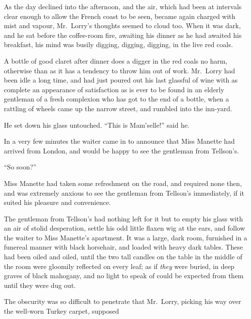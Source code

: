 As the day declined into the afternoon, and the air, which had been
at intervals clear enough to allow the French coast to be seen,
became again charged with mist and vapour, Mr.\ Lorry's thoughts
seemed to cloud too.  When it was dark, and he sat before the
coffee-room fire, awaiting his dinner as he had awaited his breakfast,
his mind was busily digging, digging, digging, in the live red coals.

A bottle of good claret after dinner does a digger in the red coals
no harm, otherwise than as it has a tendency to throw him out of
work.  Mr.\ Lorry had been idle a long time, and had just poured out
his last glassful of wine with as complete an appearance of
satisfaction as is ever to be found in an elderly gentleman of a
fresh complexion who has got to the end of a bottle, when a rattling
of wheels came up the narrow street, and rumbled into the inn-yard.

He set down his glass untouched.  ``This is Mam'selle!'' said he.

In a very few minutes the waiter came in to announce that Miss
Manette had arrived from London, and would be happy to see the
gentleman from Tellson's.

``So soon?''

Miss Manette had taken some refreshment on the road, and required
none then, and was extremely anxious to see the gentleman from
Tellson's immediately, if it suited his pleasure and convenience.

The gentleman from Tellson's had nothing left for it but to empty his
glass with an air of stolid desperation, settle his odd little flaxen
wig at the ears, and follow the waiter to Miss Manette's apartment.
It was a large, dark room, furnished in a funereal manner with black
horsehair, and loaded with heavy dark tables.  These had been oiled
and oiled, until the two tall candles on the table in the middle of
the room were gloomily reflected on every leaf; as if \emph{they} were
buried, in deep graves of black mahogany, and no light to speak of
could be expected from them until they were dug out.

The obscurity was so difficult to penetrate that Mr.\ Lorry,
picking his way over the well-worn Turkey carpet, supposed

